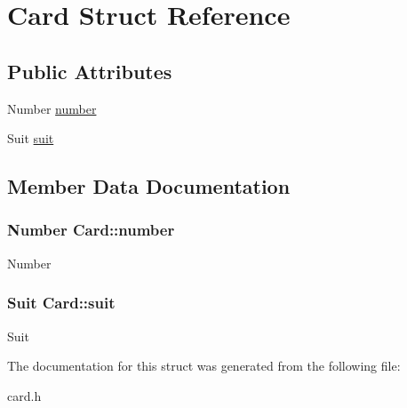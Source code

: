 \hypertarget{structCard}{\section{Card Struct Reference}
\label{structCard}
}
\subsection*{Public Attributes}
\begin{DoxyCompactItemize}
\item 
Number \hyperlink{structCard_a3dbccade15d7013d910de40a03a1f7a3}{number}
\item 
Suit \hyperlink{structCard_a5f7fd2ad3843c8f42b9f00c800bad8cb}{suit}
\end{DoxyCompactItemize}


\subsection{Member Data Documentation}
\hypertarget{structCard_a3dbccade15d7013d910de40a03a1f7a3}{
\subsubsection[{number}]{\setlength{\rightskip}{0pt plus 5cm}Number Card\+::number}}\label{structCard_a3dbccade15d7013d910de40a03a1f7a3}
Number \hypertarget{structCard_a5f7fd2ad3843c8f42b9f00c800bad8cb}{
\subsubsection[{suit}]{\setlength{\rightskip}{0pt plus 5cm}Suit Card\+::suit}}\label{structCard_a5f7fd2ad3843c8f42b9f00c800bad8cb}
Suit 

The documentation for this struct was generated from the following file\+:\begin{DoxyCompactItemize}
\item 
card.\+h\end{DoxyCompactItemize}
